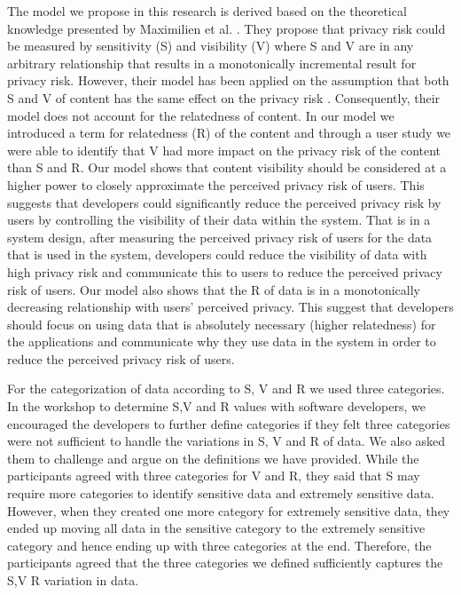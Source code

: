 \documentclass[10pt]{article}
\begin{document}
The model we propose in this research is derived based on the theoretical knowledge presented by Maximilien et al. \cite {maximilien2009privacy}. They propose that privacy risk could be measured by sensitivity (S) and visibility (V) where S and V are in any arbitrary relationship that results in a monotonically incremental result for privacy risk. However, their model has been applied on the assumption that both S and V of content has the same effect on the privacy risk \cite{minkus2014scale}. Consequently, their model does not account for the relatedness of content. In our model we introduced a term for relatedness (R) of the content and through a user study we were able to identify that V had more impact on the privacy risk of the content than S and R. Our model shows that content visibility should be considered at a higher power to closely approximate the perceived privacy risk of users. This suggests that developers could significantly reduce the perceived privacy risk by users by controlling the visibility of their data within the system. That is in a system design, after measuring the perceived privacy risk of users for the data that is used in the system, developers could reduce the visibility of data with high privacy risk and communicate this to users to reduce  the perceived privacy risk of users. Our model also shows that the R of data is in a monotonically decreasing relationship with users' perceived privacy. This suggest that developers should focus on using data that is absolutely necessary (higher relatedness) for the applications and communicate why they use data in the system in order to reduce the perceived privacy risk of users.

For the categorization of data according to S, V and R we used three categories. In the workshop to determine S,V and R values with software developers, we encouraged the developers to further define categories if they felt three categories were not sufficient to handle the variations in S, V and R of data. We also asked them to challenge and argue on the definitions we have provided. While the participants agreed with three categories for V and R, they said that S may require more categories to identify sensitive data and extremely sensitive data. However, when they created one more category for extremely sensitive data, they ended up moving all data in the sensitive category to the extremely sensitive category and hence ending up with three categories at the end. Therefore, the participants agreed that the three categories we defined sufficiently captures the S,V R variation in data. 
\end{document}
